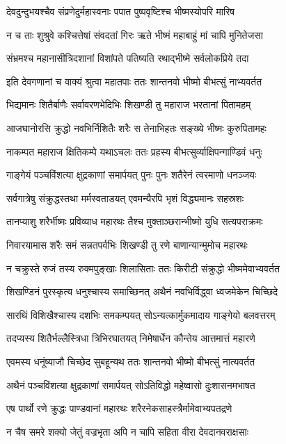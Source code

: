 \twolineshloka
{देवदुन्दुभयश्चैव संप्रणेदुर्महास्वनाः}
{पपात पुष्पवृष्टिश्च भीष्मस्योपरि मारिष}


\twolineshloka
{न च ताः शुश्रुवे कश्चित्तेषां संवदतां गिरः}
{ऋते भीष्मं महाबाहुं मां चापि मुनितेजसा}


\twolineshloka
{संभ्रमश्च महानासीत्रिदशानां विशांपते}
{पतिष्यति रथाद्भीष्मे सर्वलोकप्रिये तदा}


\twolineshloka
{इति देवगणानां च वाक्यं श्रुत्वा महातपाः}
{ततः शान्तनवो भीष्मो बीभत्सुं नाभ्यवर्तत}


\twolineshloka
{भिद्यमानः शितैर्बाणैः सर्वावरणभेदिभिः}
{शिखण्डी तु महाराज भरतानां पितामहम्}


\twolineshloka
{आजघानोरसि क्रुद्धो नवभिर्निशितैः शरैः}
{स तेनाभिहतः सङ्ख्ये भीष्मः कुरुपितामहः}


\twolineshloka
{नाकम्पत महाराज क्षितिकम्पे यथाऽचलः}
{ततः प्रहस्य बीभत्सुर्व्याक्षिपन्गाण्डिवं धनुः}


\twolineshloka
{गाङ्गेयं पञ्चविंशत्या क्षुद्रकाणां समार्पयत्}
{पुनः पुनः शतैरेनं त्वरमाणो धनञ्जयः}


\twolineshloka
{सर्वगात्रेषु संक्रुद्धस्तथा मर्मस्वताडयत्}
{एवमन्यैरपि भृशं विद्ध्यमानः सहस्रशः}


\twolineshloka
{तानप्याशु शरैर्भीष्मः प्रविव्याध महारथः}
{तैश्च मुक्ताञ्छरान्भीष्मो युधि सत्यपराक्रमः}


\twolineshloka
{निवारयामास शरैः समं सन्नतपर्वभिः}
{शिखण्डी तु रणे बाणान्यान्मुमोच महारथः}


\twolineshloka
{न चक्रुस्ते रुजं तस्य रुक्मपुङ्खाः शिलासिताः}
{ततः किरीटी संक्रुद्धो भीष्ममेवाभ्यवर्तत}


\twolineshloka
{शिखण्डिनं पुरस्कृत्य धनुश्चास्य समाच्छिनत्}
{अथैनं नवभिर्विद्ध्वा ध्वजमेकेन चिच्छिदे}


\twolineshloka
{सारथिं विशिखैश्चास्य दशभिः समकम्पयत्}
{सोऽन्यत्कार्मुकमादाय गाङ्गेयो बलवत्तरम्}


\twolineshloka
{तदप्यस्य शितैर्भल्लैस्त्रिधा त्रिभिरघातयत्}
{निमेषार्धेन कौन्तेय आत्तमात्तं महारणे}


\twolineshloka
{एवमस्य धनूंष्याजौ चिच्छेद सुबहून्यथ}
{ततः शान्तनवो भीष्मो बीभत्सुं नात्यवर्तत}


\twolineshloka
{अथैनं पञ्चविंशत्या क्षुद्रकाणां समार्पयत्}
{सोऽतिविद्धो महेष्वासो दुःशासनमभाषत}


\twolineshloka
{एष पार्थो रणे क्रुद्धः पाण्डवानां महारथः}
{शरैरनेकसाहस्त्रैर्मामेवाभ्यपतद्रणे}


\twolineshloka
{न चैष समरे शक्यो जेतुं वज्रभृता अपि}
{न चापि सहिता वीरा देवदानवराक्षसाः}


